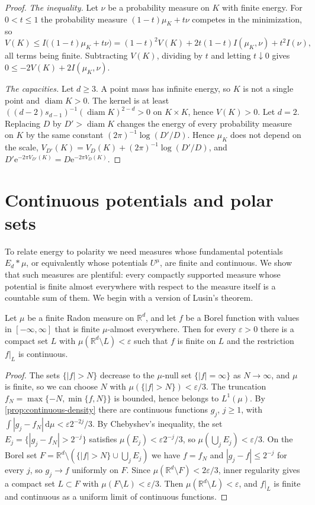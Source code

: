 \begin{proof}
\emph{The inequality.} Let $\nu$ be a probability measure on $K$ with finite energy. For $0<t\leq1$ the probability measure $(1-t)\mu_K+t\nu$ competes in the minimization, so
\[
 V(K)\leq I\bigl((1-t)\mu_K+t\nu\bigr)=(1-t)^2V(K)+2t(1-t)I(\mu_K,\nu)+t^2I(\nu),
\]
all terms being finite. Subtracting $V(K)$, dividing by $t$ and letting $t\downarrow0$ gives $0\leq-2V(K)+2I(\mu_K,\nu)$.

\emph{The capacities.} Let $d\geq3$. A point mass has infinite energy, so $K$ is not a single point and $\operatorname{diam}K>0$. The kernel is at least $((d-2)s_{d-1})^{-1}(\operatorname{diam}K)^{2-d}>0$ on $K\times K$, hence $V(K)>0$. Let $d=2$. Replacing $D$ by $D'>\operatorname{diam}K$ changes the energy of every probability measure on $K$ by the same constant $(2\pi)^{-1}\log(D'/D)$. Hence $\mu_K$ does not depend on the scale, $V_{D'}(K)=V_D(K)+(2\pi)^{-1}\log(D'/D)$, and $D'\mathrm e^{-2\pi V_{D'}(K)}=D\mathrm e^{-2\pi V_D(K)}$.
\end{proof}

\section{Continuous potentials and polar sets}
\label{sec:continuous-potentials}
To relate energy to polarity we need measures whose fundamental potentials $E_d*\mu$, or equivalently whose potentials $U^\mu$, are finite and continuous. We show that such measures are plentiful: every compactly supported measure whose potential is finite almost everywhere with respect to the measure itself is a countable sum of them. We begin with a version of Lusin's theorem.

\begin{lemma}\label{lem:lusin-finite-measure}
Let $\mu$ be a finite Radon measure on $\mathbb R^d$, and let $f$ be a Borel function with values in $[-\infty,\infty]$ that is finite $\mu$-almost everywhere. Then for every $\varepsilon>0$ there is a compact set $L$ with $\mu(\mathbb R^d\setminus L)<\varepsilon$ such that $f$ is finite on $L$ and the restriction $f|_L$ is continuous.
\end{lemma}
\begin{proof}
The sets $\{|f|>N\}$ decrease to the $\mu$-null set $\{|f|=\infty\}$ as $N\to\infty$, and $\mu$ is finite, so we can choose $N$ with $\mu(\{|f|>N\})<\varepsilon/3$. The truncation $f_N=\max\{-N,\min\{f,N\}\}$ is bounded, hence belongs to $L^1(\mu)$. By \cref{prop:continuous-density} there are continuous functions $g_j$, $j\geq1$, with $\int|g_j-f_N|\,\mathrm d\mu<\varepsilon2^{-2j}/3$. By Chebyshev's inequality, the set $E_j=\{|g_j-f_N|>2^{-j}\}$ satisfies $\mu(E_j)<\varepsilon2^{-j}/3$, so $\mu(\bigcup_jE_j)<\varepsilon/3$. On the Borel set $F=\mathbb R^d\setminus(\{|f|>N\}\cup\bigcup_jE_j)$ we have $f=f_N$ and $|g_j-f|\leq2^{-j}$ for every $j$, so $g_j\to f$ uniformly on $F$. Since $\mu(\mathbb R^d\setminus F)<2\varepsilon/3$, inner regularity gives a compact set $L\subset F$ with $\mu(F\setminus L)<\varepsilon/3$. Then $\mu(\mathbb R^d\setminus L)<\varepsilon$, and $f|_L$ is finite and continuous as a uniform limit of continuous functions.
\end{proof}

